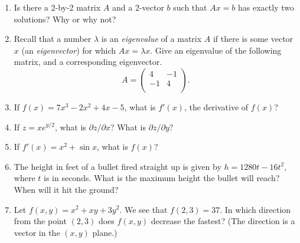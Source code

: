 \documentclass[11pt]{article}
\begin{document}
\begin{enumerate}
\item
Is there a 2-by-2 matrix $A$ and a 2-vector $b$ such that $Ax=b$ has
exactly two solutions?  Why or why not?

\item
Recall that a number $\lambda$ is an {\em eigenvalue} 
of a matrix $A$ if there is some vector $x$ 
(an {\em eigenvector}) for which $Ax = \lambda x$.
Give an eigenvalue of the following matrix, and a corresponding eigenvector.
$$ A = \left(
\begin{array}{cc}
4 & -1 \\ 	
-1 & 4 \\
\end{array} 
\right). $$

\item
If $f(x)=7x^3-2x^2+4x-5$, what is $f'(x)$, the derivative of $f(x)$?

\item
If $z = xe^{y/2}$, what is $\partial z / \partial x$?
What is $\partial z / \partial y$?

\item
If $f'(x) = x^2 + \sin x$, what is $f(x)$?

\item
The height in feet of a bullet fired straight up is
given by $h=1280t-16t^2$, where $t$ is in seconds.
What is the maximum height the bullet will reach? 
When will it hit the ground?


\item
Let $f(x,y) = x^2 + xy + 3y^2$. We see that $f(2,3) = 37$. 
In which direction from the point $(2,3)$ does $f(x,y)$ decrease
the fastest? (The direction is a vector in the $(x,y)$ plane.)

\end{enumerate}
\end{document}
